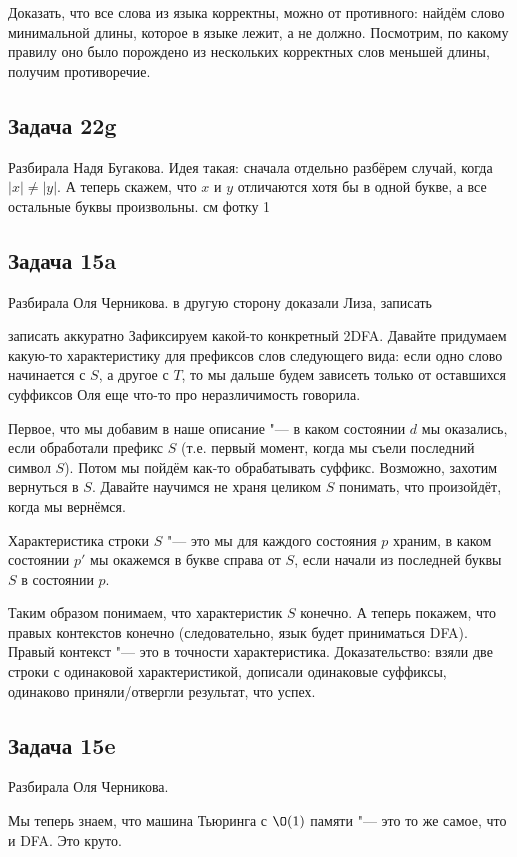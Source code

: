 		Доказать, что все слова из языка корректны, можно от противного: найдём слово
		минимальной длины, которое в языке лежит, а не должно.
		Посмотрим, по какому правилу оно было порождено из нескольких корректных слов меньшей длины,
		получим противоречие.

\subsection{Задача 22g}
	Разбирала Надя Бугакова.
	Идея такая: сначала отдельно разбёрем случай, когда $|x|\neq |y|$.
	А теперь скажем, что $x$ и $y$ отличаются хотя бы в одной букве,
	а все остальные буквы произвольны.
	\TODO см фотку 1

\subsection{Задача 15a}
	Разбирала Оля Черникова.
	\TODO в другую сторону доказали Лиза, записать

	\TODO записать аккуратно
	Зафиксируем какой-то конкретный 2DFA.
	Давайте придумаем какую-то характеристику для префиксов слов следующего вида:
	если одно слово начинается с $S$, а другое с $T$, то мы дальше будем зависеть только от
	оставшихся суффиксов \TODO Оля еще что-то про неразличимость говорила.

	Первое, что мы добавим в наше описание "--- в каком состоянии $d$ мы оказались, если
	обработали префикс $S$ (т.е. первый момент, когда мы съели последний символ $S$).
	Потом мы пойдём как-то обрабатывать суффикс.
	Возможно, захотим вернуться в $S$.
	Давайте научимся не храня целиком $S$ понимать, что произойдёт, когда мы вернёмся.

	Характеристика строки $S$ "--- это мы для каждого состояния $p$ храним, в каком состоянии
	$p'$ мы окажемся в букве справа от $S$, если начали из последней буквы $S$ в состоянии $p$.

	Таким образом понимаем, что характеристик $S$ конечно.
	А теперь покажем, что правых контекстов конечно (следовательно, язык будет приниматься DFA).
	Правый контекст "--- это в точности характеристика.
	Доказательство: взяли две строки с одинаковой характеристикой, дописали одинаковые суффиксы,
	одинаково приняли/отвергли результат, что успех.

\subsection{Задача 15e}
	Разбирала Оля Черникова.
	\begin{Rem}
		Мы теперь знаем, что машина Тьюринга с $\O(1)$ памяти "--- это то же самое,
		что и DFA.
		Это круто.
	\end{Rem}

